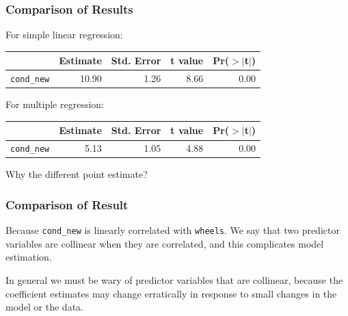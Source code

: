 \documentclass[handout]{beamer}
\newcommand{\blue}[1]{\textcolor{blue2}{#1}}
\begin{document}
\begin{frame}[fragile]
\frametitle{Comparison of Results}

For simple linear regression:
\begin{table}[ht]
\centering
\begin{tabular}{r|rrrr}
  \hline
 & Estimate & Std. Error & t value & Pr($>$$|$t$|$) \\ 
  \hline
{\tt cond\_new} & 10.90 & 1.26 & 8.66 & 0.00 \\ 
   \hline
\end{tabular}
\end{table}
\pause
For multiple regression:
\begin{table}[ht]
\centering
\begin{tabular}{r|rrrr}
  \hline
 & Estimate & Std. Error & t value & Pr($>$$|$t$|$) \\ 
  \hline
{\tt cond\_new} & 5.13 & 1.05 & 4.88 & 0.00 \\ 
   \hline
\end{tabular}
\end{table}
Why the different point estimate?
\end{frame}


\begin{frame}[fragile]
\frametitle{Comparison of Result}

Because {\tt cond\_new} is linearly correlated with {\tt wheels}.  We say that two predictor variables are \blue{collinear} when they are correlated, and this complicates model estimation.

\pause\vspace{0.5cm}

In general we must be wary of predictor variables that are collinear, because the coefficient estimates may change erratically in response to small changes in the model or the data.

\end{frame}
\end{document}
